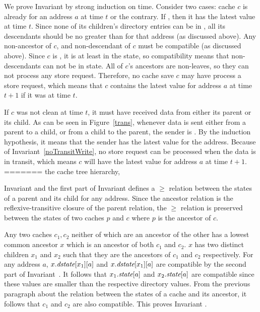 We prove Invariant  by strong induction on
time. Consider two cases: cache $c$ is already \clean{} for an address
$a$ at time $t$ or the contrary.  If \clean{}, then it has the latest
value at time $t$. Since none of its children's directory entries can
be in \Mo{}, all its descendants should be no greater than \Sh{} for
that address (as discussed above). Any non-ancestor of $c$, and
non-descendant of $c$ must be compatible (as discussed above). Since
$c$ is \clean, it is at least in the \Sh{} state, so compatibility
means that non-descendants can not be in \Mo{} state. All of $c$'s
ancestors are non-leaves, so they can not process any store
request. Therefore, no cache save $c$ may have process a store
request, which means that $c$ contains the latest value for address
$a$ at time $t+1$ if it was \clean{} at time $t$.

If $c$ was not clean at time $t$, it must have received data from
either its parent or its child.  As can be seen in Figure~\ref{trans},
whenever data is sent either from a parent to a child, or from a child
to the parent, the sender is \clean. By the induction hypothesis, it
means that the sender has the latest value for the address. Because of
Invariant~\ref{noTransitWrite}, no store request can be processed when
the data is in transit, which means $c$ will have the latest value for
address $a$ at time $t+1$. 
=======
the cache tree hierarchy,

Invariant  and the first part of Invariant
 defines a $\ge$ relation between the states of a
parent and its child for any address.  Since the ancestor relation is the
reflexive-transitive closure of the parent relation, the $\ge$ relation is
preserved between the states of two caches $p$ and $c$ where $p$ is the
ancestor of $c$.

Any two caches $c_1, c_2$ neither of which are an ancestor of the other has a
lowest common ancestor $x$ which is an ancestor of both $c_1$ and $c_2$. $x$
has two distinct children $x_1$ and $x_2$ such that they are the ancestors of
$c_1$ and $c_2$ respectively. For any address $a$, $x.\textit{dstate}[x_1][a]$ and
$x.\textit{dstate}[x_1][a]$ are compatible by the second part of
Invariant~. It follows that $x_1.\textit{state}[a]$ and
$x_2.\textit{state}[a]$ are compatible since these values are smaller than the
respective directory values.  From the previous paragraph about the relation
between the states of a cache and its ancestor, it follows that $c_1$ and $c_2$
are also compatible. This proves Invariant .

